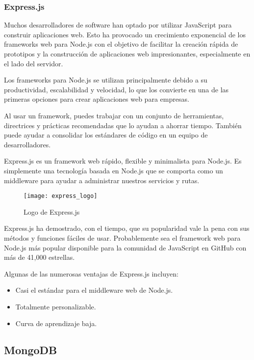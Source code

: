 \subsubsection{Express.js}

Muchos desarrolladores de software han optado por utilizar JavaScript para construir aplicaciones web. Esto ha provocado un crecimiento exponencial de los frameworks web para Node.js con el objetivo de facilitar la creación rápida de prototipos y la construcción de aplicaciones web impresionantes, especialmente en el lado del servidor.

Los frameworks para Node.js se utilizan principalmente debido a su productividad, escalabilidad y velocidad, lo que los convierte en una de las primeras opciones para crear aplicaciones web para empresas.

Al usar un framework, puedes trabajar con un conjunto de herramientas, directrices y prácticas recomendadas que lo ayudan a ahorrar tiempo. También puede ayudar a consolidar los estándares de código en un equipo de desarrolladores.

Express.js es un framework web rápido, flexible y minimalista para Node.js. Es simplemente una tecnología basada en Node.js que se comporta como un middleware para ayudar a administrar nuestros servicios y rutas.

\begin{figure}[htp!]
  \centering
  \texttt{[image: express\_logo]}
  \caption{Logo de Express.js}
  \label{fig:express_logo}
\end{figure}

Express.js ha demostrado, con el tiempo, que su popularidad vale la pena con sus métodos y funciones fáciles de usar. Probablemente sea el framework web para Node.js más popular disponible para la comunidad de JavaScript en GitHub con más de 41,000 estrellas.

Algunas de las numerosas ventajas de Express.js incluyen:

\begin{itemize}
  \item Casi el estándar para el middleware web de Node.js.
  \item Totalmente personalizable.
  \item Curva de aprendizaje baja.
\end{itemize}

\subsection{MongoDB}

